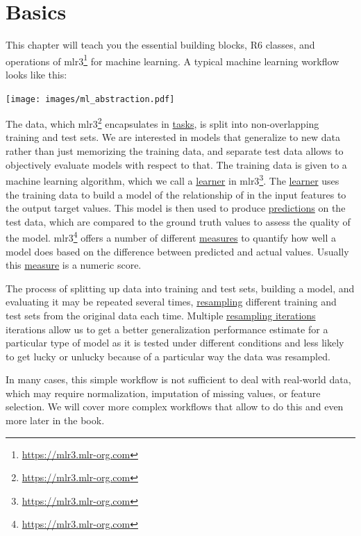 \documentclass[12pt,]{scrbook}
\renewcommand{\href}[2]{#2\footnote{\url{#1}}}
\begin{document}
\hypertarget{basics}{%
\chapter{Basics}\label{basics}}

This chapter will teach you the essential building blocks, R6 classes, and operations of \href{https://mlr3.mlr-org.com}{mlr3} for machine learning.
A typical machine learning workflow looks like this:

\texttt{[image: images/ml\_abstraction.pdf]}

The data, which \href{https://mlr3.mlr-org.com}{mlr3} encapsulates in \protect\hyperlink{tasks}{tasks}, is split into non-overlapping training and test sets.
We are interested in models that generalize to new data rather than just memorizing the training data, and separate test data allows to objectively evaluate models with respect to that.
The training data is given to a machine learning algorithm, which we call a \protect\hyperlink{learners}{learner} in \href{https://mlr3.mlr-org.com}{mlr3}.
The \protect\hyperlink{learners}{learner} uses the training data to build a model of the relationship of in the input features to the output target values.
This model is then used to produce \protect\hyperlink{predicting}{predictions} on the test data, which are compared to the ground truth values to assess the quality of the model.
\href{https://mlr3.mlr-org.com}{mlr3} offers a number of different \protect\hyperlink{measure}{measures} to quantify how well a model does based on the difference between predicted and actual values.
Usually this \protect\hyperlink{measure}{measure} is a numeric score.

The process of splitting up data into training and test sets, building a model, and evaluating it may be repeated several times, \protect\hyperlink{resampling}{resampling} different training and test sets from the original data each time.
Multiple \protect\hyperlink{resampling}{resampling iterations} iterations allow us to get a better generalization performance estimate for a particular type of model as it is tested under different conditions and less likely to get lucky or unlucky because of a particular way the data was resampled.

In many cases, this simple workflow is not sufficient to deal with real-world data, which may require normalization, imputation of missing values, or feature selection.
We will cover more complex workflows that allow to do this and even more later in the book.
\end{document}
